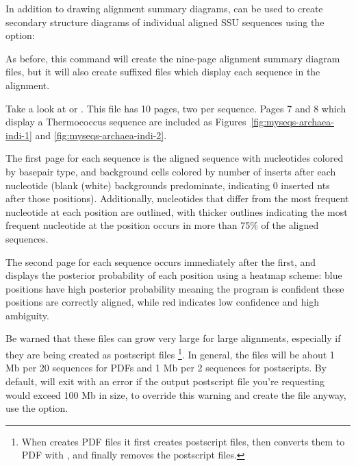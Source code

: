 In addition to drawing alignment summary diagrams,  can
be used to create secondary structure diagrams of individual aligned
SSU sequences using the  option:


As before, this command will create the nine-page alignment summary
diagram files, but it will also create  suffixed
files which display each sequence in the alignment. 

Take a look at  or
. This file has 10 pages, two per
sequence. Pages 7 and 8 which display a Thermococcus sequence are
included as Figures~\ref{fig:myseqs-archaea-indi-1} and
\ref{fig:myseqs-archaea-indi-2}.

The first page for each sequence is the aligned sequence with
nucleotides colored by basepair type, and background cells colored by
number of inserts after each nucleotide (blank (white) backgrounds
predominate, indicating 0 inserted nts after those
positions). Additionally, nucleotides that differ from the most
frequent nucleotide at each position are outlined, with thicker
outlines indicating the most frequent nucleotide at the position
occurs in more than 75\% of the aligned sequences.

The second page for each sequence occurs immediately after
the first, and displays the posterior probability of each position
using a heatmap scheme: blue positions have high posterior
probability meaning the program is confident these positions are
correctly aligned, while red indicates low confidence and high
ambiguity. 

Be warned that these files can grow very large for large alignments,
especially if they are being created as postscript
files \footnote{When  creates PDF files it first
  creates postscript files, then converts them to PDF with
  , and finally removes the postscript files.}. In
general, the files will be about 1 Mb per 20 sequences for PDFs and 1
Mb per 2 sequences for postscripts. By default,  will
exit with an error if the output postscript file you're requesting
would exceed 100 Mb in size, to override this warning and create the
file anyway, use the  option.

